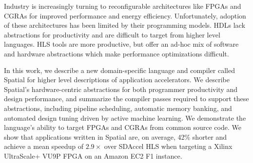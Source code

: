 Industry is increasingly turning to reconfigurable architectures like FPGAs and CGRAs for improved performance and energy
efficiency. 
Unfortunately, adoption of these architectures has been limited by their programming models. HDLs lack abstractions for productivity and are difficult to target from higher level languages. HLS tools are more productive, but offer an ad-hoc mix of software and hardware abstractions which make performance optimizations difficult. 

In this work, we describe a new domain-specific language and compiler called Spatial for higher level descriptions of application accelerators.
We describe Spatial's hardware-centric abstractions for both programmer productivity and design performance, and summarize the compiler passes required to support these abstractions, including pipeline scheduling, automatic memory banking, and automated design tuning driven by active machine learning.
We demonstrate the language's ability to target FPGAs and CGRAs from common source code. We show that applications written in Spatial
are, on average, 42\% shorter and achieve a mean speedup of $2.9\times$ over SDAccel HLS when targeting a Xilinx UltraScale+ VU9P FPGA on an Amazon EC2 F1 instance.



